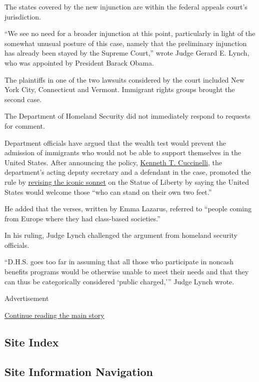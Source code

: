 The states covered by the new injunction are within the federal appeals
court's jurisdiction.

``We see no need for a broader injunction at this point, particularly in
light of the somewhat unusual posture of this case, namely that the
preliminary injunction has already been stayed by the Supreme Court,''
wrote Judge Gerard E. Lynch, who was appointed by President Barack
Obama.

The plaintiffs in one of the two lawsuits considered by the court
included New York City, Connecticut and Vermont. Immigrant rights groups
brought the second case.

The Department of Homeland Security did not immediately respond to
requests for comment.

Department officials have argued that the wealth test would prevent the
admission of immigrants who would not be able to support themselves in
the United States. After announcing the policy,
\href{https://www.nytimes.com/2019/09/05/us/politics/ken-cuccinelli-immigration-trump.html}{Kenneth
T. Cuccinelli}, the department's acting deputy secretary and a defendant
in the case, promoted the rule by
\href{https://www.nytimes.com/2019/08/14/us/cuccinelli-statue-liberty-poem.html}{revising
the iconic sonnet} on the Statue of Liberty by saying the United States
would welcome those ``who can stand on their own two feet.''

He added that the verses, written by Emma Lazarus, referred to ``people
coming from Europe where they had class-based societies.''

In his ruling, Judge Lynch challenged the argument from homeland
security officials.

``D.H.S. goes too far in assuming that all those who participate in
noncash benefits programs would be otherwise unable to meet their needs
and that they can thus be categorically considered `public charged,'''
Judge Lynch wrote.

Advertisement

\protect\hyperlink{after-bottom}{Continue reading the main story}

\hypertarget{site-index}{%
\subsection{Site Index}\label{site-index}}

\hypertarget{site-information-navigation}{%
\subsection{Site Information
Navigation}\label{site-information-navigation}}


